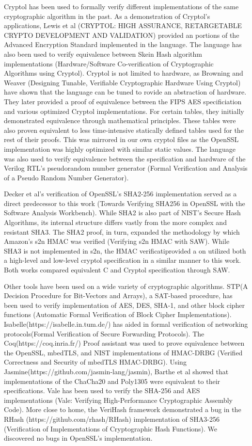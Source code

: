 Cryptol has been used to formally verify different implementations of the same cryptographic algorithm in the past.
As a demonstration of Cryptol's applications, Lewis et al (CRYPTOL: HIGH ASSURANCE, RETARGETABLE CRYPTO
DEVELOPMENT AND VALIDATION) provided an portions of the Advanced Encryption Standard implemented in the language.
The language has also been used to verify equivalence between Skein Hash algorithm implementations (Hardware/Software Co-verification of Cryptographic Algorithms using Cryptol).
Cryptol is not limited to hardware, as Browning and Weaver (Designing Tunable, Verifiable Cryptographic Hardware Using Cryptol) have shown that the language can be tuned to rovide an abstraction of hardware.
They later provided a proof of equivalence between the FIPS AES specificiation and various optimized Cryptol implementations.
For certain tables, they initially demonstrated equivalence through mathematical principles.
These tables were also proven equivalent to less time-intensive statically defined tables used for the rest of their proofs.
This was mirrored in our own cryptol files as the OpenSSL implementation was highly optimized with similar static values.
The language was also used to verify equivalence between the specification and hardware of the Verilog RTL's pseudorandom number generator (Formal Verification and Analysis of a Pseudo Random Number Generator).

Decker et al's verification of OpenSSL's SHA2-256 implementation served as a direct predecessor to this work (Towards Verifying SHA256 in OpenSSL with the Software Analysis Workbench).
While SHA2 is also part of NIST's Secure Hash Algorithms, its internal structure differs vastly from the more complex and resistant SHA3.
The SHA2 proof, in turn, expanded the methodology by which Amazon's s2n HMAC was verified (Verifying s2n HMAC with SAW).
While SHA3 is not implemented in s2n, the HMAC verificatiprovided a on utilized both a high-level and low-level cryptol specification in a similar manner to this work.
Both works compared equivalent C and Cryptol specification through SAW.

Other tools have been used on a wide variety of cryptographic algorithms.
STP(A Decision Procedure for Bit-Vectors and Arrays), a SAT-based procedure, has been used to verify implementation of AES, DES, SHA-1, and other block cipher functions (Automatic Formal Verification of Block Cipher Implementations).
Isabelle(https://isabelle.in.tum.de/) has aided in formal verification of networking protocols(Formal Verification of Secure Forwarding Protocols).
The Coq(https://coq.inria.fr/) Proof assistant was used to prove equivalence between the OpenSSL, mbedTLS, and NIST implementations of HMAC-DRBG (Verified Correctness and Security of mbedTLS HMAC-DRBG).
Using Jasmine(https://github.com/jasmin-lang/jasmin), Barthe et al showed that implementations of the ChaCha20 and Poly1305 were equivalent to their specifications.
Vale has been used to verify the SHA-256 and AES implementations (Vale: Verifying High-Performance Cryptographic Assembly Code).
More close to home, the VeriHash framework demonstrated a bug in the RHash (https://github.com/rhash/RHash) implementation of SHA3-256 (Verification of Implementations of Cryptographic Hash Functions).
We discovered no bugs in OpenSSL's implementation.
